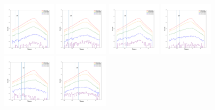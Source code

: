 \documentclass[12pt,prd]{article}
\begin{document}
\begin{figure}[h!]
\centering
\includegraphics[width=0.24\textwidth]{../figures/scanning_plotsgaiascan_l75_0_b66_4_ra216_0_dec41_0_npy_0.pdf}
\includegraphics[width=0.24\textwidth]{../figures/scanning_plotsgaiascan_l75_0_b66_4_ra216_0_dec41_0_npy_1.pdf}
\includegraphics[width=0.24\textwidth]{../figures/scanning_plotsgaiascan_l75_0_b66_4_ra216_0_dec41_0_npy_2.pdf}
\includegraphics[width=0.24\textwidth]{../figures/scanning_plotsgaiascan_l75_0_b66_4_ra216_0_dec41_0_npy_3.pdf}
\includegraphics[width=0.24\textwidth]{../figures/scanning_plotsgaiascan_l75_0_b66_4_ra216_0_dec41_0_npy_4.pdf}
\includegraphics[width=0.24\textwidth]{../figures/scanning_plotsgaiascan_l75_0_b66_4_ra216_0_dec41_0_npy_5.pdf}

\end{figure}
\end{document}
